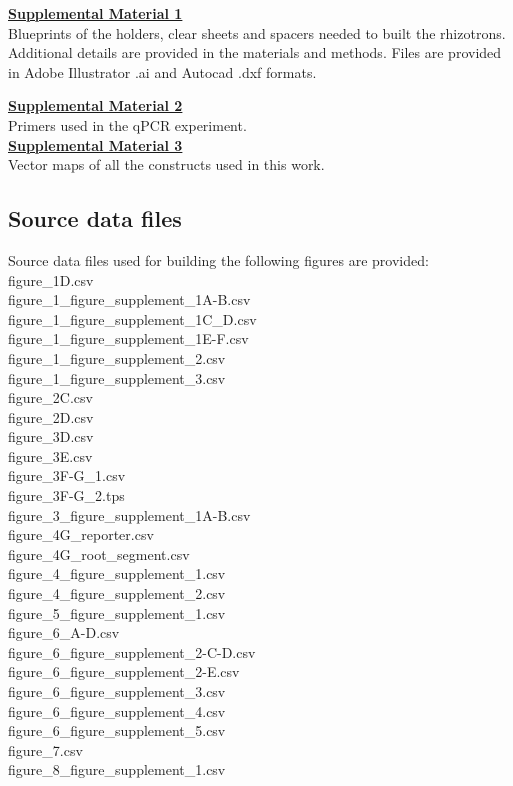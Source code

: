 \documentclass[]{article}
\begin{document}
\textbf{\href{https://www.dropbox.com/s/f01cg10hqehpnv6/supplement_1.zip?dl=0}{Supplemental
Material 1}}\\Blueprints of the holders, clear sheets and spacers needed
to built the rhizotrons. Additional details are provided in the
materials and methods. Files are provided in Adobe Illustrator .ai and
Autocad .dxf formats.

\textbf{\href{https://www.dropbox.com/s/hn1hhuttdby7y0j/supplement_2.csv?dl=0}{Supplemental
Material 2}}\\Primers used in the qPCR
experiment.\\\textbf{\href{https://www.dropbox.com/s/kg0r5df4nx3tjpy/supplement_3.zip?dl=0}{Supplemental
Material 3}}\\Vector maps of all the constructs used in this work.

\subsection{Source data files}\label{source-data-files}

Source data files used for building the following figures are provided:
figure\_1D.csv\\figure\_1\_figure\_supplement\_1A-B.csv\\figure\_1\_figure\_supplement\_1C\_D.csv\\figure\_1\_figure\_supplement\_1E-F.csv\\figure\_1\_figure\_supplement\_2.csv\\figure\_1\_figure\_supplement\_3.csv\\figure\_2C.csv\\figure\_2D.csv\\figure\_3D.csv\\figure\_3E.csv\\figure\_3F-G\_1.csv\\figure\_3F-G\_2.tps\\figure\_3\_figure\_supplement\_1A-B.csv\\figure\_4G\_reporter.csv\\figure\_4G\_root\_segment.csv\\figure\_4\_figure\_supplement\_1.csv\\figure\_4\_figure\_supplement\_2.csv\\figure\_5\_figure\_supplement\_1.csv\\figure\_6\_A-D.csv\\figure\_6\_figure\_supplement\_2-C-D.csv\\figure\_6\_figure\_supplement\_2-E.csv\\figure\_6\_figure\_supplement\_3.csv\\figure\_6\_figure\_supplement\_4.csv\\figure\_6\_figure\_supplement\_5.csv\\figure\_7.csv\\figure\_8\_figure\_supplement\_1.csv
\end{document}
